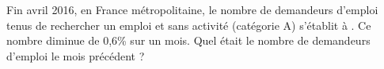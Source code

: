 
Fin avril 2016, en France métropolitaine, le nombre de demandeurs d'emploi tenus de rechercher un emploi et sans activité (catégorie A) s'établit à . Ce nombre diminue de 0,6\% sur un mois. Quel était le nombre de demandeurs d'emploi le mois précédent ?